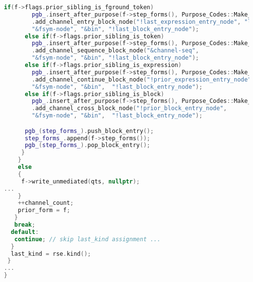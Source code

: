\begin{lstlisting}[language = C++, numbers = none, escapechar = !,
    basicstyle = \ttfamily\bfseries\scriptsize, linewidth = .9\linewidth]
      if(f->flags.prior_sibling_is_fground_token)
        pgb_.insert_after_purpose(f->step_forms(), Purpose_Codes::Make_Token_Node_FSym)
        .add_channel_entry_block_node("!last_expression_entry_node", "lambda",
        "&fsym-node", "&bin", "!last_block_entry_node");
      else if(f->flags.prior_sibling_is_token)
        pgb_.insert_after_purpose(f->step_forms(), Purpose_Codes::Make_Token_Node_FSym)
        .add_channel_sequence_block_node("&channel-seq",
        "&fsym-node", "&bin", "!last_block_entry_node");
      else if(f->flags.prior_sibling_is_expression)
        pgb_.insert_after_purpose(f->step_forms(), Purpose_Codes::Make_Token_Node_FSym)
        .add_channel_continue_block_node("!prior_expression_entry_node",
        "&fsym-node", "&bin",  "!last_block_entry_node");
      else if(f->flags.prior_sibling_is_block)
        pgb_.insert_after_purpose(f->step_forms(), Purpose_Codes::Make_Token_Node_FSym)
        .add_channel_cross_block_node("!prior_block_entry_node",
        "&fsym-node", "&bin",  "!last_block_entry_node");

      pgb_(step_forms_).push_block_entry();
      step_forms_.append(f->step_forms());
      pgb_(step_forms_).pop_block_entry();
     }
    }
    else
    {
     f->write_unmediated(qts, nullptr);
...
    }
    ++channel_count;
    prior_form = f;
   }
   break;
  default:
   continue; // skip last_kind assignment ...
  }
  last_kind = rse.kind();
 }
...
}


\end{lstlisting}
